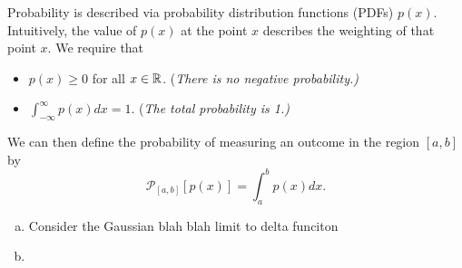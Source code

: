 \documentclass[12pt]{amsbook}
\begin{document}
\newpage
\begin{problem}
Probability is described via probability distribution functions (PDFs) $p(x)$. Intuitively, the value of $p(x)$ at the point $x$ describes the weighting of that point $x$. We require that
\begin{itemize}
	\item $p(x)\geq 0$ for all $x\in \mathbb{R}$. (\emph{There is no negative probability.)}
	\item $\displaystyle{\int_{-\infty}^\infty p(x)dx=1}$. (\emph{The total probability is 1.)}
\end{itemize}
We can then define the probability of measuring an outcome in the region $[a,b]$ by
\[
\mathcal{P}_{[a,b]}[p(x)] = \int_a^b p(x)dx.
\]
\begin{enumerate}[(a)]
	\item Consider the Gaussian blah blah limit to delta funciton
	\item
\end{enumerate}
\end{problem}
\end{document}
